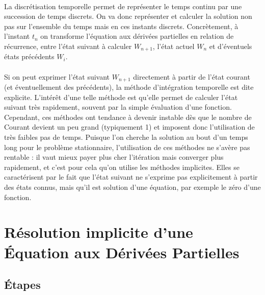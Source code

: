 		\paragraph{}
		La discrétisation temporelle permet de représenter le temps continu par une succession de temps discrets.
		On va donc représenter et calculer la solution non pas sur l'ensemble du temps mais en ces instants discrets.
		Concrètement, à l'instant $t_n$ on transforme l'équation aux dérivées partielles en relation de récurrence, entre l'état suivant à calculer $W_{n+1}$, l'état actuel $W_n$ et d'éventuels états précédents $W_i$.

		\paragraph{}
		Si on peut exprimer l'état suivant $W_{n+1}$ directement à partir de l'état courant (et éventuellement des précédents), la méthode d'intégration temporelle est dite explicite.
		L'intérêt d'une telle méthode est qu'elle permet de calculer l'état suivant très rapidement, souvent par la simple évaluation d'une fonction.
		Cependant, ces méthodes ont tendance à devenir instable dès que le nombre de Courant devient un peu grand (typiquement 1) et imposent donc l'utilisation de très faibles pas de temps.
		Puisque l'on cherche la solution au bout d'un temps long pour le problème stationnaire, l'utilisation de ces méthodes ne s'avère pas rentable : il vaut mieux payer plus cher l'itération mais converger plus rapidement, et c'est pour cela qu'on utilise les méthodes implicites.
		Elles se caractérisent par le fait que l'état suivant ne s'exprime pas explicitement à partir des états connus, mais qu'il est solution d'une équation, par exemple le zéro d'une fonction.



\section{Résolution implicite d'une Équation aux Dérivées Partielles}

	\subsection{Étapes}

